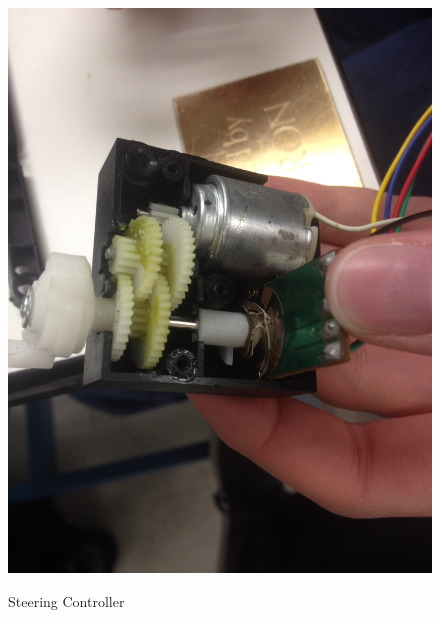 \documentclass[12pt]{article}
\begin{document}
\begin{figure}[H]
\begin {center}
\includegraphics[scale=.10]{encoder}\\
\caption{Steering Controller}
\label{fig:steering}
\end {center}
\end{figure}
\end{document}
